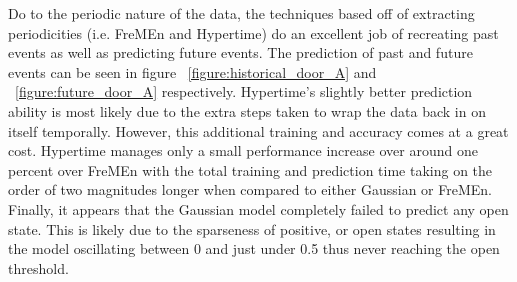 Do to the periodic nature of the data, the techniques based off of extracting
periodicities (i.e. FreMEn and Hypertime) do an excellent job of recreating
past events as well as predicting future events. The prediction of past and future events can be seen in
figure ~\ref{figure:historical_door_A} and ~\ref{figure:future_door_A} respectively. Hypertime's slightly better
prediction ability is most likely due to the extra steps taken to wrap the data back
in on itself temporally. However, this additional training and accuracy comes at a
great cost. Hypertime manages only a small performance increase over
around one percent over FreMEn with the total training and prediction time
taking on the order of two magnitudes longer when compared to either Gaussian or FreMEn.
Finally, it appears that the Gaussian model completely failed to predict any
open state.  This is likely due to the sparseness of positive, or open
states resulting in the model oscillating between 0 and just under 0.5 thus
never reaching the open threshold. \\

